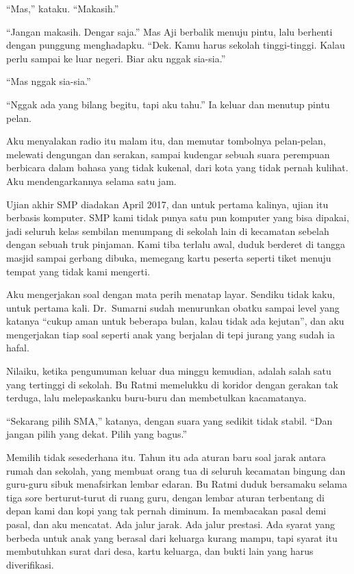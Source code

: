 \documentclass[11pt,twoside,openany]{book}
\makeatletter
\newcommand{\scenebreak}{\par\vspace{0.9em}{\centering\textsc{*\hspace{0.7em}*\hspace{0.7em}*}\par}\vspace{0.9em}\@afterindentfalse\@afterheading}
\makeatother
\begin{document}
``Mas,'' kataku. ``Makasih.''

``Jangan makasih. Dengar saja.'' Mas Aji berbalik menuju pintu, lalu berhenti dengan punggung menghadapku. ``Dek. Kamu harus sekolah tinggi-tinggi. Kalau perlu sampai ke luar negeri. Biar aku nggak sia-sia.''

``Mas nggak sia-sia.''

``Nggak ada yang bilang begitu, tapi aku tahu.'' Ia keluar dan menutup pintu pelan.

Aku menyalakan radio itu malam itu, dan memutar tombolnya pelan-pelan, melewati dengungan dan serakan, sampai kudengar sebuah suara perempuan berbicara dalam bahasa yang tidak kukenal, dari kota yang tidak pernah kulihat. Aku mendengarkannya selama satu jam.

\scenebreak
Ujian akhir SMP diadakan April 2017, dan untuk pertama kalinya, ujian itu berbasis komputer. SMP kami tidak punya satu pun komputer yang bisa dipakai, jadi seluruh kelas sembilan menumpang di sekolah lain di kecamatan sebelah dengan sebuah truk pinjaman. Kami tiba terlalu awal, duduk berderet di tangga masjid sampai gerbang dibuka, memegang kartu peserta seperti tiket menuju tempat yang tidak kami mengerti.

Aku mengerjakan soal dengan mata perih menatap layar. Sendiku tidak kaku, untuk pertama kali. Dr.~Sumarni sudah menurunkan obatku sampai level yang katanya ``cukup aman untuk beberapa bulan, kalau tidak ada kejutan'', dan aku mengerjakan tiap soal seperti anak yang berjalan di tepi jurang yang sudah ia hafal.

Nilaiku, ketika pengumuman keluar dua minggu kemudian, adalah salah satu yang tertinggi di sekolah. Bu Ratmi memelukku di koridor dengan gerakan tak terduga, lalu melepaskanku buru-buru dan membetulkan kacamatanya.

``Sekarang pilih SMA,'' katanya, dengan suara yang sedikit tidak stabil. ``Dan jangan pilih yang dekat. Pilih yang bagus.''

Memilih tidak sesederhana itu. Tahun itu ada aturan baru soal jarak antara rumah dan sekolah, yang membuat orang tua di seluruh kecamatan bingung dan guru-guru sibuk menafsirkan lembar edaran. Bu Ratmi duduk bersamaku selama tiga sore berturut-turut di ruang guru, dengan lembar aturan terbentang di depan kami dan kopi yang tak pernah diminum. Ia membacakan pasal demi pasal, dan aku mencatat. Ada jalur jarak. Ada jalur prestasi. Ada syarat yang berbeda untuk anak yang berasal dari keluarga kurang mampu, tapi syarat itu membutuhkan surat dari desa, kartu keluarga, dan bukti lain yang harus diverifikasi.
\end{document}
